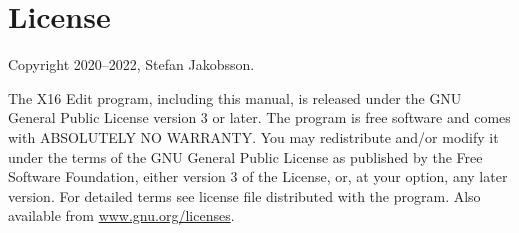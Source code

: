 \documentclass{article}
\begin{document}
\section{License}
	Copyright 2020--2022, Stefan Jakobsson.

	The X16 Edit program, including this manual, is released under the GNU General Public License version 3 or later.
    The program is free software and comes with ABSOLUTELY NO WARRANTY. You may redistribute and/or modify it under the 
    terms of the GNU General Public License as pub­lished by the Free Software Foundation, either version 3 of the License, 
    or, at your option, any later version. For detailed terms see license file distributed with the program. 
    Also available from \href{https://www.gnu.org/licenses}{www.gnu.org/licenses}.
\end{document}
